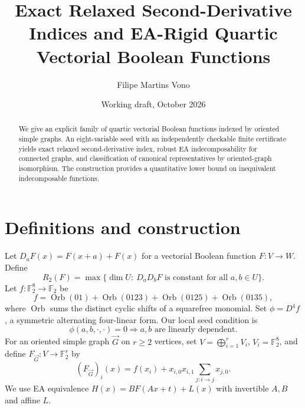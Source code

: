 \documentclass[11pt]{article}
\title{Exact Relaxed Second-Derivative Indices and EA-Rigid Quartic Vectorial Boolean Functions}
\author{Filipe Martins Vono}
\date{Working draft, October 2026}
\newcommand{\F}{\mathbb F}
\begin{document}
\maketitle
\begin{abstract}
We give an explicit family of quartic vectorial Boolean functions indexed by oriented simple graphs. An eight-variable seed with an independently checkable finite certificate yields exact relaxed second-derivative index, robust EA indecomposability for connected graphs, and classification of canonical representatives by oriented-graph isomorphism. The construction provides a quantitative lower bound on inequivalent indecomposable functions.
\end{abstract}
\section{Definitions and construction}
Let $D_aF(x)=F(x+a)+F(x)$ for a vectorial Boolean function $F:V\to W$. Define
\[
R_2(F)=\max\{\dim U:\ D_aD_bF\text{ is constant for all }a,b\in U\}.
\]
Let $f:\F_2^8\to\F_2$ be
\[
f=\operatorname{Orb}(01)+\operatorname{Orb}(0123)+\operatorname{Orb}(0125)+\operatorname{Orb}(0135),
\]
where $\operatorname{Orb}$ sums the distinct cyclic shifts of a squarefree monomial. Set $\phi=D^4f$, a symmetric alternating four-linear form. Our local seed condition is
\begin{equation}\label{A}
\phi(a,b,\cdot,\cdot)=0\Longrightarrow a,b\text{ are linearly dependent}.
\end{equation}
For an oriented simple graph $\vec G$ on $r\ge2$ vertices, set $V=\bigoplus_{i=1}^rV_i$, $V_i=\F_2^8$, and define $F_{\vec G}:V\to\F_2^r$ by
\begin{equation}\label{construction}
(F_{\vec G})_i(x)=f(x_i)+x_{i,0}x_{i,1}\sum_{j:i\to j}x_{j,0}.
\end{equation}
We use EA equivalence $H(x)=B F(Ax+t)+L(x)$ with invertible $A,B$ and affine $L$.
\end{document}
